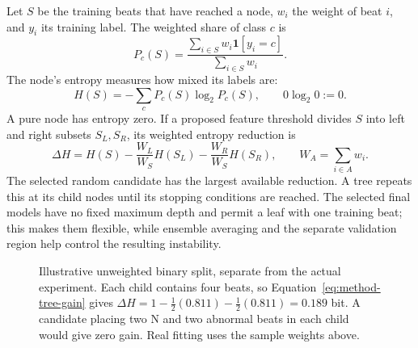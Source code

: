 Let $S$ be the training beats that have reached a node, $w_i$ the weight of
beat $i$, and $y_i$ its training label. The weighted share of class $c$ is
\begin{equation}
 P_c(S)=\frac{\sum_{i\in S}w_i\mathbf{1}[y_i=c]}
 {\sum_{i\in S}w_i}.
 \label{eq:method-node-class-share}
\end{equation}
The node's entropy measures how mixed its labels are:
\begin{equation}
 H(S)=-\sum_c P_c(S)\log_2 P_c(S),
 \qquad 0\log_2 0:=0.
 \label{eq:method-node-entropy}
\end{equation}
A pure node has entropy zero. If a proposed feature threshold divides $S$
into left and right subsets $S_L,S_R$, its weighted entropy reduction is
\begin{equation}
 \Delta H=H(S)-\frac{W_L}{W_S}H(S_L)
                  -\frac{W_R}{W_S}H(S_R),
 \qquad W_A=\sum_{i\in A}w_i.
 \label{eq:method-tree-gain}
\end{equation}
The selected random candidate has the largest available reduction. A tree
repeats this at its child nodes until its stopping conditions are reached.
The selected final models have no fixed maximum depth and permit a leaf with
one training beat; this makes them flexible, while ensemble averaging and
the separate validation region help control the resulting instability.

\begin{figure}[H]
\centering
{}
\caption[Worked example of entropy reduction in a tree.]{Illustrative
unweighted binary split, separate from the actual experiment. Each child
contains four beats, so Equation~\ref{eq:method-tree-gain} gives
$\Delta H=1-\tfrac12(0.811)-\tfrac12(0.811)=0.189$ bit. A candidate
placing two N and two abnormal beats in each child would give zero gain.
Real fitting uses the sample weights above.}
\label{fig:method-tree-entropy-example}
\end{figure}

